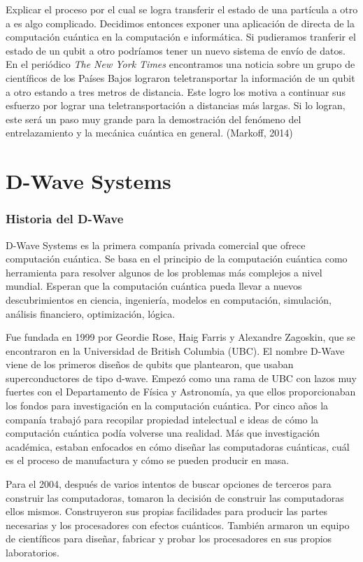 \documentclass[11pt,a4paper]{article}
\begin{document}
Explicar el proceso por el cual se logra transferir el estado de una partícula a otro a es algo complicado. Decidimos entonces exponer una aplicación de directa de la computación cuántica en la computación e informática. Si pudieramos tranferir el estado de un qubit a otro podríamos tener un nuevo sistema de envío de datos. En el periódico \textit{The New York Times} encontramos una noticia sobre un grupo de científicos de los Países Bajos lograron teletransportar la información de un qubit a otro estando a tres metros de distancia. Este logro los motiva a continuar sus esfuerzo por lograr una teletransportación a distancias más largas. Si lo logran, este será un paso muy grande para la demostración del fenómeno del entrelazamiento y la mecánica cuántica en general. (Markoff, 2014)
\clearpage
\part{D-Wave Systems}
\section*{Historia del D-Wave}
D-Wave Systems es la primera companía privada comercial que ofrece computación cuántica. Se basa en el principio de la computación cuántica como herramienta para resolver algunos de los problemas más complejos a nivel mundial. Esperan que la computación cuántica pueda llevar a nuevos descubrimientos en ciencia, ingeniería, modelos en computación, simulación, análisis financiero, optimización, lógica.

Fue fundada en 1999 por Geordie Rose, Haig Farris y Alexandre Zagoskin, que se encontraron en la Universidad de British Columbia (UBC). El nombre D-Wave viene de los primeros diseños de qubits que plantearon, que usaban superconductores de tipo d-wave. Empezó como una rama de UBC con lazos muy fuertes con el Departamento de Física y 
Astronomía, ya que ellos proporcionaban los fondos para investigación en la computación cuántica. 
Por cinco años la companía trabajó para recopilar propiedad intelectual e ideas de cómo la computación cuántica podía volverse una realidad. Más que investigación académica, estaban enfocados en cómo diseñar las computadoras cuánticas, cuál es el proceso de manufactura y cómo se pueden producir en masa. 

Para el 2004, después de varios intentos de buscar opciones de terceros para construir las computadoras, tomaron la decisión de construir las computadoras ellos mismos. Construyeron sus propias facilidades para producir las partes necesarias y los procesadores con efectos cuánticos. También armaron un equipo de científicos para diseñar, fabricar y probar los procesadores en sus propios laboratorios. 
\end{document}
